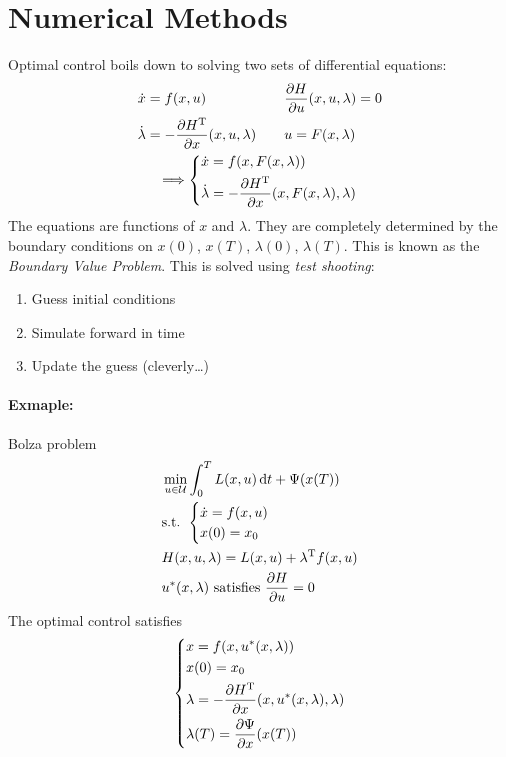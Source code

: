 \section{Numerical Methods}
Optimal control boils down to solving two sets of differential equations:
\begin{gather}
  \begin{aligned}
    \dot x &= f(x,u) & \quad & \frac{\partial H}{\partial u}(x,u,\lambda) = 0 \\
    \dot\lambda &= -\frac{\partial H^\text{T}}{\partial x}(x,u,\lambda) && u = F(x,\lambda) \\
  \end{aligned} \\
  \Longrightarrow \begin{dcases}
    \dot x = f(x,F(x,\lambda)) \\
    \dot \lambda = -\frac{\partial H^\text{T}}{\partial x}(x,F(x,\lambda),\lambda)
  \end{dcases}
\end{gather}
The equations are functions of $x$ and $\lambda$. They are completely determined by the boundary conditions on $x(0)$, $x(T)$, $\lambda(0)$, $\lambda(T)$. This is known as the \emph{Boundary Value Problem}. This is solved using \emph{test shooting}:
\begin{enumerate}
\item Guess initial conditions
\item Simulate forward in time
\item Update the guess (cleverly\dots)
\end{enumerate}

\paragraph{Exmaple:} Bolza problem
\begin{align}
  & \min_{u\in\mathcal U} \int_0^T L(x,u)\mathop{}\!\mathrm{d} t + \Psi(x(T)) \\
  & \text{s.t. } \begin{cases}
    \dot x=f(x,u) \\
    x(0) = x_0
  \end{cases} \\
  & H(x,u,\lambda) = L(x,u) + \lambda^\text{T} f(x,u) \\
  & u^* (x,\lambda) \text{ satisfies } \frac{\partial H}{\partial u} = 0
\end{align}
The optimal control satisfies
\begin{gather}
  \begin{dcases}
    x = f(x,u^*(x,\lambda)) \\
    x(0) = x_0 \\
    \lambda = -\frac{\partial H^\text{T}}{\partial x} (x,u^*(x,\lambda),\lambda) \\
    \lambda(T) = \frac{\partial \Psi}{\partial x}(x(T))
  \end{dcases}
\end{gather}

